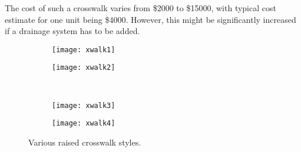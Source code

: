 The cost of such a crosswalk varies from \$2000 to \$15000, with typical cost estimate for one unit being \$4000\cite{traffic-calming-xwalks}. However, this might be significantly increased if a drainage system has to be added.

\begin{figure}[!htbp]
\centering
\begin{subfigure}[t]{0.45\textwidth}
	\texttt{[image: xwalk1]}
\end{subfigure}
\begin{subfigure}[t]{0.45\textwidth}
	\texttt{[image: xwalk2]}
\end{subfigure}\\
\begin{subfigure}[t]{0.45\textwidth}
	\texttt{[image: xwalk3]}
\end{subfigure}
\begin{subfigure}[t]{0.45\textwidth}
	\texttt{[image: xwalk4]}
\end{subfigure}
\caption[Various raised crosswalk styles]{Various raised crosswalk styles.\cite{traffic-calming-xwalks}}
\end{figure}